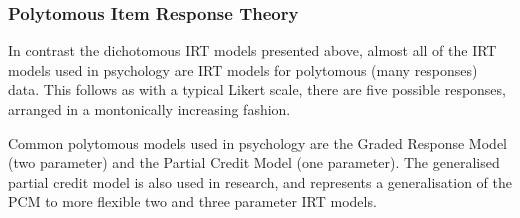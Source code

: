 


\subsubsection{Polytomous Item Response Theory}
\label{sec:polyt-item-resp}
In contrast the dichotomous IRT models presented above, almost all of the IRT models used in psychology are IRT models for polytomous (many responses) data. This follows as with a typical Likert scale, there are five possible responses, arranged  in a montonically increasing fashion.


Common polytomous models used in psychology are the Graded Response Model \cite{van1997handbook} (two parameter) and the Partial Credit Model (one parameter)\cite{fischer1995rasch}. The generalised partial credit model is also used in research, and represents a generalisation of the PCM to more flexible two and three parameter IRT models. 

